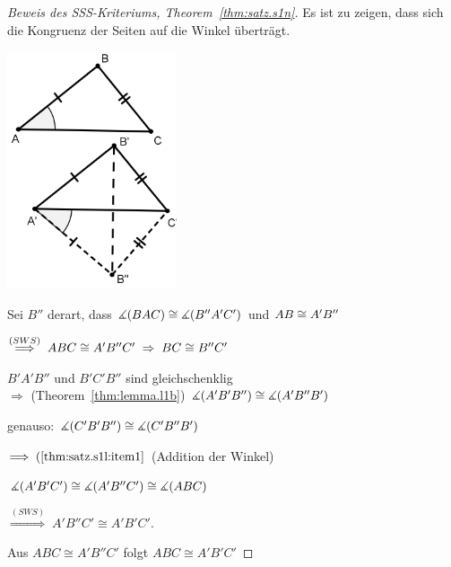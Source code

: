 \begin{proof}[Beweis des SSS-Kriteriums, Theorem~\ref{thm:satz.s1n}]
    Es ist zu zeigen, dass sich die Kongruenz der Seiten auf die Winkel überträgt.

    \centerline{\includegraphics[width=5cm]{BILDER/1-2-21-SSS.png}}

    Sei $B''$ derart, dass $\mbox{$\measuredangle$}(BAC) \cong \mbox{$\measuredangle$}(B''A'C')$ und ${AB} \cong {A'B''}$

    $\stackrel{(SWS)}{\Longrightarrow}\; ABC \cong A'B''C'\; \Rightarrow\;{BC} \cong
    {B''C'}$

    $B'A'B''$ und $B'C'B''$ sind gleichschenklig\\
    $\Longrightarrow$ (Theorem~\ref{thm:lemma.l1b}) $\mbox{$\measuredangle$}(A'B'B'') \cong \mbox{$\measuredangle$}(A'B''B')$

    genauso: $\mbox{$\measuredangle$}(C'B'B'') \cong \mbox{$\measuredangle$}(C'B''B')$

    $\Longrightarrow\; (\ref{thm:satz.s1l:item1}$ (Addition der Winkel)

    $\mbox{$\measuredangle$}(A'B'C') \cong \mbox{$\measuredangle$}(A'B''C') \cong \mbox{$\measuredangle$}(ABC)$

    $\stackrel{(SWS)}{\Longrightarrow}\; A'B''C' \cong A'B'C'$.

    Aus $ABC \cong A'B''C'$ folgt $ABC \cong A'B'C'$
\end{proof}



